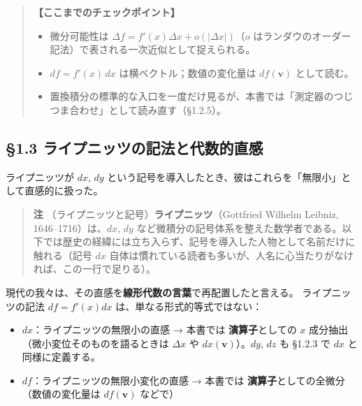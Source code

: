 \documentclass[a4paper,12pt,openany]{book}
\begin{document}
\par\vspace{0.35em}\par

\begin{quote}
\textbf{【ここまでのチェックポイント】}

\begin{itemize}
\item
  微分可能性は \(\Delta f = f'(x)\Delta x + o(|\Delta x|)\)（\(o\)
  はランダウのオーダー記法）で表される一次近似として捉えられる。
\item
  \(df = f'(x)\,dx\) は横ベクトル；数値の変化量は \(df(\mathbf{v})\)
  として読む。
\item
  置換積分の標準的な入口を一度だけ見るが、本書では「測定器のつじつま合わせ」として読み直す（§1.2.5）。
\end{itemize}
\end{quote}

\par\vspace{0.35em}\par

\hypertarget{ux30e9ux30a4ux30d7ux30cbux30c3ux30c4ux306eux8a18ux6cd5ux3068ux4ee3ux6570ux7684ux76f4ux611f}{%
\subsection{§1.3
ライプニッツの記法と代数的直感}\label{ux30e9ux30a4ux30d7ux30cbux30c3ux30c4ux306eux8a18ux6cd5ux3068ux4ee3ux6570ux7684ux76f4ux611f}}

ライプニッツが \(dx\), \(dy\)
という記号を導入したとき、彼はこれらを「無限小」として直感的に扱った。

\begin{quote}
\textbf{注} （ライプニッツと記号）\textbf{ライプニッツ}（Gottfried
Wilhelm Leibniz, 1646–1716）は、\(dx\), \(dy\)
など微積分の記号体系を整えた数学者である。以下では歴史の経緯には立ち入らず、記号を導入した人物として名前だけに触れる（記号
\(dx\)
自体は慣れている読者も多いが、人名に心当たりがなければ、この一行で足りる）。
\end{quote}

現代の我々は、その直感を\textbf{線形代数の言葉}で再配置したと言える。
ライプニッツの記法 \(df = f'(x)dx\) は、単なる形式的等式ではない：

\begin{itemize}
\item
  \(dx\)：ライプニッツの無限小の直感 → 本書では \textbf{演算子}としての
  \(x\) 成分抽出（微小変位そのものを語るときは \(\Delta x\) や
  \(dx(\mathbf{v})\)）。\(dy\), \(dz\) も §1.2.3 で \(dx\)
  と同様に定義する。
\item
  \(df\)：ライプニッツの無限小変化の直感 → 本書では
  \textbf{演算子}としての全微分（数値の変化量は \(df(\mathbf{v})\)
  などで）
\end{itemize}
\end{document}
